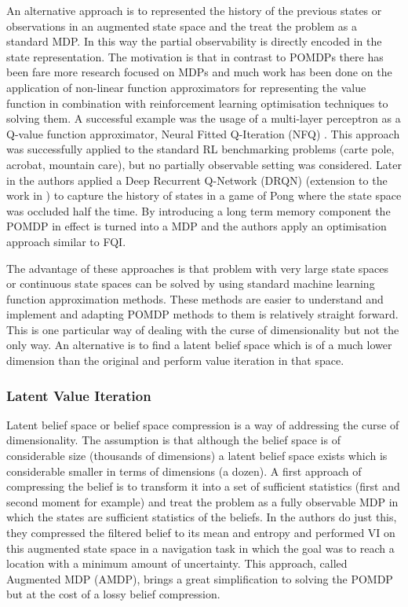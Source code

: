 An alternative approach is to represented the history of the previous states or observations in an augmented state space and the treat the problem 
as a standard MDP. In this way the partial observability is directly encoded in the state representation. The motivation is that in contrast to 
POMDPs there has been fare more research focused on MDPs and much work has been done on the application of non-linear function 
approximators for representing the value function in combination with reinforcement learning optimisation techniques to solving them.
A successful example was the usage of a multi-layer perceptron as a Q-value function approximator, Neural Fitted Q-Iteration (NFQ) \cite{neura_fqi_2005}.
This approach was successfully applied to the standard RL benchmarking problems (carte pole, acrobat, mountain care), but no partially observable
setting was considered. Later in \cite{DRQ_AAAI_2015} the authors applied a Deep Recurrent Q-Network (DRQN) (extension to the work in \cite{mnih-dqn-2015}) to capture the history of states 
in a game of Pong where the state space was occluded half the time. By introducing a long term memory component the POMDP in effect is turned into a MDP and the authors apply an optimisation approach similar to FQI. 

The advantage of these approaches is that problem with very large state spaces or continuous state spaces can be solved by using
standard machine learning function approximation methods. These methods are easier to understand and implement and adapting 
POMDP methods to them is relatively straight forward. This is one particular way of dealing with the curse of dimensionality but not the 
only way. An alternative is to find a latent belief space which is of a much lower dimension than the original and perform value iteration in 
that space.

\subsubsection{Latent Value Iteration}

Latent belief space or belief space compression is a way of addressing the curse of dimensionality. The assumption 
is that although the belief space is of considerable size (thousands of dimensions) a latent belief space exists 
which is considerable smaller in terms of dimensions (a dozen).
A first approach of compressing the belief is to transform it into a set of sufficient statistics (first and second moment for example) and  
treat the problem as a fully observable MDP in which the states are sufficient statistics of the beliefs. 
In \cite{Roy99coastalnavigation} the authors do just this, they compressed the filtered belief to its mean and entropy and performed VI on 
this augmented state space in a navigation task in which the goal was to reach a location with a minimum amount of uncertainty. This approach,
called Augmented MDP (AMDP), brings a great simplification to solving the POMDP but at the cost of a lossy belief compression. 

